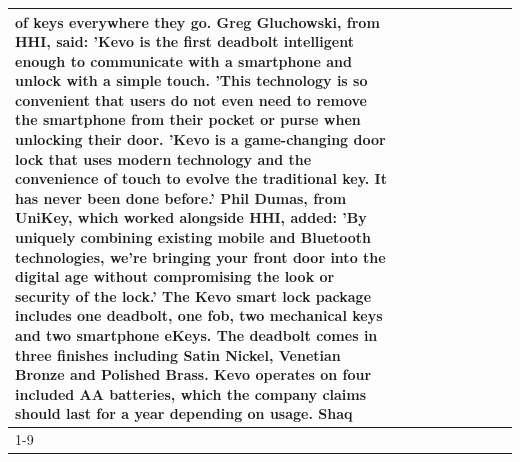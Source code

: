 \begin{table}[H]
\begin{tabular}{lllrlllll}
of keys everywhere they go. Greg Gluchowski, from HHI, said: 'Kevo is the first deadbolt intelligent enough to communicate with a smartphone and unlock with a simple touch. 'This technology is so convenient that users do not even need to remove the smartphone from their pocket or purse when unlocking their door. 'Kevo is a game-changing door lock that uses modern technology and the convenience of touch to evolve the traditional key. It has never been done before.' Phil Dumas, from UniKey, which worked alongside HHI, added: 'By uniquely combining existing mobile and Bluetooth technologies, we’re bringing your front door into the digital age without compromising the look or security of the lock.' The Kevo smart lock package includes one deadbolt, one fob, two mechanical keys and two smartphone eKeys. The deadbolt comes in three finishes including Satin Nickel, Venetian Bronze and Polished Brass. Kevo operates on four included AA batteries, which the company claims should last for a year depending on usage. Shaq \\
\cline{1-9}

\end{tabular}
\end{table}
